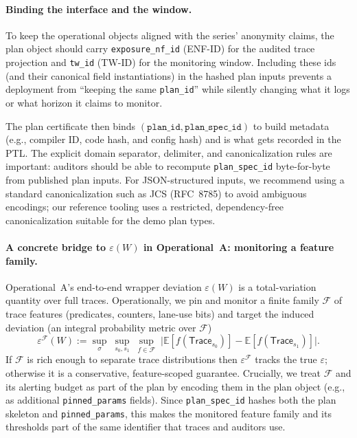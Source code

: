 \documentclass[11pt]{article}
\begin{document}
\paragraph{Binding the interface and the window.}
To keep the operational objects aligned with the series' anonymity claims, the plan object should carry
\texttt{exposure\_nf\_id} (ENF-ID) for the audited trace projection and \texttt{tw\_id} (TW-ID) for the monitoring window.
Including these ids (and their canonical field instantiations) in the hashed plan inputs prevents a deployment from ``keeping the same \texttt{plan\_id}''
while silently changing what it logs or what horizon it claims to monitor.\cite{series:traceifaces,series:threatwindows}


The plan certificate then binds $(\texttt{plan\_id},\texttt{plan\_spec\_id})$ to build metadata (e.g., compiler ID, code hash, and config hash) and is what gets recorded in the PTL.
The explicit domain separator, delimiter, and canonicalization rules are important: auditors should be able to recompute \texttt{plan\_spec\_id} byte-for-byte from published plan inputs.
For JSON-structured inputs, we recommend using a standard canonicalization such as JCS (RFC~8785) to avoid ambiguous encodings; our reference tooling uses a restricted, dependency-free canonicalization suitable for the demo plan types.\cite{rfc8785}

\paragraph{A concrete bridge to $\varepsilon(W)$ in Operational~A: monitoring a feature family.}
Operational~A's end-to-end wrapper deviation $\varepsilon(W)$ is a total-variation quantity over full traces.
Operationally, we pin and monitor a finite family $\mathcal{F}$ of trace features (predicates, counters, lane-use bits) and target the induced deviation (an integral probability metric over $\mathcal{F}$)\cite{sriperumbudurIPM2012}
\[\varepsilon^{\mathcal{F}}(W) := \sup_{\sigma}\;\sup_{s_0,s_1}\;\sup_{f\in\mathcal{F}}\;\big|\mathbb{E}[f(\mathsf{Trace}_{s_0})]-\mathbb{E}[f(\mathsf{Trace}_{s_1})]\big|.\]
If $\mathcal{F}$ is rich enough to separate trace distributions then $\varepsilon^{\mathcal{F}}$ tracks the true $\varepsilon$; otherwise it is a conservative, feature-scoped guarantee.
Crucially, we treat $\mathcal{F}$ and its alerting budget as part of the plan by encoding them in the plan object (e.g., as additional \texttt{pinned\_params} fields). Since \texttt{plan\_spec\_id} hashes both the plan skeleton and \texttt{pinned\_params}, this makes the monitored feature family and its thresholds part of the same identifier that traces and auditors use.
\end{document}
